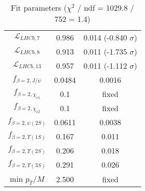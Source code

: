 \begin{table}[h!]
\begin{tabular}{c|c|c}
$\mathcal L_{LHCb,7}$ & 0.986 & 0.014 (-0.840 $\sigma$) \\
$\mathcal L_{LHCb,8}$ & 0.913 & 0.011 (-1.735 $\sigma$) \\
$\mathcal L_{LHCb,13}$ & 0.957 & 0.011 (-1.112 $\sigma$) \\
$f_{\beta=2,J/\psi}$ & 0.0484 & 0.0016 \\
$f_{\beta=2,\chi_{c1}}$ & 0.1 & fixed \\
$f_{\beta=2,\chi_{c2}}$ & 0.1 & fixed \\
$f_{\beta=2,\psi(2S)}$ & 0.0611 & 0.0038 \\
$f_{\beta=2,\Upsilon(1S)}$ & 0.167 & 0.011 \\
$f_{\beta=2,\Upsilon(2S)}$ & 0.206 & 0.018 \\
$f_{\beta=2,\Upsilon(3S)}$ & 0.291 & 0.026 \\
min $p_T/M$ & 2.500 & fixed \\
\end{tabular}
\caption{Fit parameters ($\chi^2$ / ndf = 1029.8 / 752 = 1.4)}
\end{table}
